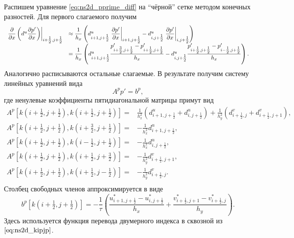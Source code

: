 Распишем уравнение \eqref{eq:ns2d_pprime_diff}
на ``чёрной'' сетке методом конечных разностей.
Для первого слагаемого получим
\begin{equation}
\label{eq:ns2d_d2pdx2}
\begin{array}{ll}
\left.\dfrac{\partial }{\partial x}\left(d^u \dfrac{\partial p'}{\partial x}\right) \right|_{i+\tfrac12, j+\tfrac12}
    &\approx
        \dfrac{1}{h_x}\left(
            d^u_{i+1, j+\tfrac12} \left. \dfrac{\partial p'}{\partial x} \right|_{i+1, j+\tfrac12} -
            d^u_{i, j+\tfrac12} \left. \dfrac{\partial p'}{\partial x} \right|_{i, j+\tfrac12}
        \right) \\[10pt]

    &=
        \dfrac{1}{h_x}\left(
            d^u_{i+1, j+\tfrac12} \dfrac{p'_{i+\tfrac32,j+\tfrac12} - p'_{i+\tfrac12,j+\tfrac12}}{h_x} - 
            d^u_{i, j+\tfrac12}  \dfrac{p'_{i+\tfrac12,j+\tfrac12} - p'_{i-\tfrac12,j+\tfrac12}}{h_x}
        \right).
\end{array}
\end{equation}
Аналогично расписываются остальные слагаемые. В результате получим систему линейных уравнений вида
\begin{equation}
    \label{eq:ns2d_pprime_slae}
    A^p p' = b^p,
\end{equation}
где ненулевые коэффициенты пятидиагональной матрицы примут вид
\begin{align}
    \label{eq:ns2d_ap}
    A^p[k(i+\tfrac12, j+\tfrac12), k(i+\tfrac12, j+\tfrac12)] =&
        \frac{1}{h_x^2}\left( d^u_{i+1,j+\tfrac12} + d^u_{i,j+\tfrac12} \right)
        +\frac{1}{h_y^2}\left( d^v_{i+\tfrac12,j} + d^v_{i+\tfrac12,j+1} \right), \\[10pt]
    \nonumber
    A^p[k(i+\tfrac12, j+\tfrac12), k(i+\tfrac32, j+\tfrac12)] =&
        -\frac{1}{h_x^2}d^u_{i+1,j+\tfrac12}, \\[10pt]
    \nonumber
    A^p[k(i+\tfrac12, j+\tfrac12), k(i-\tfrac12, j+\tfrac12)] =&
        -\frac{1}{h_x^2}d^u_{i,j+\tfrac12}, \\[10pt]
    \nonumber
    A^p[k(i+\tfrac12, j+\tfrac12), k(i+\tfrac12, j+\tfrac32)] =&
        -\frac{1}{h_y^2}d^v_{i+\tfrac12,j+1}, \\[10pt]
    \nonumber
    A^p[k(i+\tfrac12, j+\tfrac12), k(i+\tfrac12, j-\tfrac12)] =&
        -\frac{1}{h_y^2}d^v_{i+\tfrac12,j}.\\[10pt]
\end{align}
Столбец свободных членов аппроксимируется в виде
\begin{equation}
    \label{eq:ns2d_bp}
    b^p[k(i+\tfrac12,j+\tfrac12)] = 
        -\frac{1}{\tau}
        \left(
              \frac{u^*_{i+1,j+\tfrac12} - u^*_{i,j+\tfrac12}}{h_x}
            + \frac{v^*_{i+\tfrac12,j+1} - v^*_{i+\tfrac12,j}}{h_y}
        \right).
\end{equation}
Здесь используется функция перевода двумерного индекса в сквозной из $\eqref{eq:ns2d_kipjp}$.

